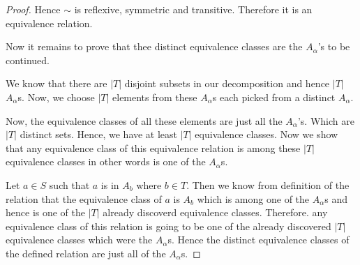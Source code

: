\begin{proof}
Hence \( \sim  \) is reflexive, symmetric and transitive. Therefore it is an equivalence relation.

Now it remains to prove that thee distinct equivalence classes are the \( A_{\alpha} \)'s to be continued.

We know that there are \( |T  | \) disjoint subsets in our decomposition and hence 
\( | T | \) \( A_{\alpha } \)s. Now, we choose \( | T | \) elements from these \( A_{\alpha} \)s each picked from a distinct \( A_{\alpha } \).

Now, the equivalence classes of all these elements are just all the \( A_{\alpha} \)'s. Which are \( |T  | \) distinct sets. Hence, we have at least \( |T  | \) equivalence classes. Now we 
show that any equivalence class of this equivalence relation is among these \( |T  | \) equivalence classes in other words is one of the \( A_{\alpha} \)s.

Let \( a \in S \) such that \( a  \) is in \( A_{b} \) where \( b \in T \). Then we know from definition of the relation that the equivalence class of 
\( a \) is \( A_{b} \) which is among one of the \( A_{\alpha} \)s and hence is one of the \( |T  | \) already discoverd equivalence classes. Therefore. any equivalence
class of this relation is going to be one of the already discovered \( |T  | \) equivalence classes which were the \( A_{\alpha} \)s. Hence the distinct equivalence classes of the defined relation are just all
of the \( A_{\alpha } \)s.
\end{proof}




